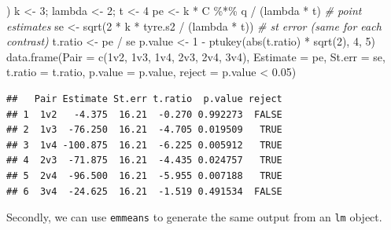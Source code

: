 \documentclass[
]{book}
\newenvironment{Shaded}{\begin{snugshade}}{\end{snugshade}}
\newcommand{\AttributeTok}[1]{\textcolor[rgb]{0.77,0.63,0.00}{#1}}
\newcommand{\CommentTok}[1]{\textcolor[rgb]{0.56,0.35,0.01}{\textit{#1}}}
\newcommand{\DecValTok}[1]{\textcolor[rgb]{0.00,0.00,0.81}{#1}}
\newcommand{\FloatTok}[1]{\textcolor[rgb]{0.00,0.00,0.81}{#1}}
\newcommand{\FunctionTok}[1]{\textcolor[rgb]{0.00,0.00,0.00}{#1}}
\newcommand{\NormalTok}[1]{#1}
\newcommand{\OtherTok}[1]{\textcolor[rgb]{0.56,0.35,0.01}{#1}}
\newcommand{\SpecialCharTok}[1]{\textcolor[rgb]{0.00,0.00,0.00}{#1}}
\newcommand{\StringTok}[1]{\textcolor[rgb]{0.31,0.60,0.02}{#1}}
\theoremstyle{definition}
\theoremstyle{definition}
\theoremstyle{definition}
\theoremstyle{definition}
\theoremstyle{remark}
\begin{document}
\begin{Shaded}
\begin{Highlighting}[]
\NormalTok{)}
\NormalTok{k }\OtherTok{\textless{}{-}} \DecValTok{3}\NormalTok{; lambda }\OtherTok{\textless{}{-}} \DecValTok{2}\NormalTok{; t }\OtherTok{\textless{}{-}} \DecValTok{4}
\NormalTok{pe }\OtherTok{\textless{}{-}}\NormalTok{ k }\SpecialCharTok{*}\NormalTok{ C }\SpecialCharTok{\%*\%}\NormalTok{ q }\SpecialCharTok{/}\NormalTok{ (lambda }\SpecialCharTok{*}\NormalTok{ t) }\CommentTok{\# point estimates}
\NormalTok{se }\OtherTok{\textless{}{-}} \FunctionTok{sqrt}\NormalTok{(}\DecValTok{2} \SpecialCharTok{*}\NormalTok{ k }\SpecialCharTok{*}\NormalTok{ tyre.s2 }\SpecialCharTok{/}\NormalTok{ (lambda }\SpecialCharTok{*}\NormalTok{ t)) }\CommentTok{\# st error (same for each contrast)}
\NormalTok{t.ratio }\OtherTok{\textless{}{-}}\NormalTok{ pe }\SpecialCharTok{/}\NormalTok{ se}
\NormalTok{p.value }\OtherTok{\textless{}{-}} \DecValTok{1} \SpecialCharTok{{-}} \FunctionTok{ptukey}\NormalTok{(}\FunctionTok{abs}\NormalTok{(t.ratio) }\SpecialCharTok{*} \FunctionTok{sqrt}\NormalTok{(}\DecValTok{2}\NormalTok{), }\DecValTok{4}\NormalTok{, }\DecValTok{5}\NormalTok{)}
\FunctionTok{data.frame}\NormalTok{(}\AttributeTok{Pair =} \FunctionTok{c}\NormalTok{(}\StringTok{\textquotesingle{}1v2\textquotesingle{}}\NormalTok{, }\StringTok{\textquotesingle{}1v3\textquotesingle{}}\NormalTok{, }\StringTok{\textquotesingle{}1v4\textquotesingle{}}\NormalTok{, }\StringTok{\textquotesingle{}2v3\textquotesingle{}}\NormalTok{, }\StringTok{\textquotesingle{}2v4\textquotesingle{}}\NormalTok{, }\StringTok{\textquotesingle{}3v4\textquotesingle{}}\NormalTok{),}
  \AttributeTok{Estimate =}\NormalTok{ pe, }\AttributeTok{St.err =}\NormalTok{ se, }\AttributeTok{t.ratio =}\NormalTok{ t.ratio, }
           \AttributeTok{p.value =}\NormalTok{ p.value, }\AttributeTok{reject =}\NormalTok{ p.value }\SpecialCharTok{\textless{}} \FloatTok{0.05}\NormalTok{)}
\end{Highlighting}
\end{Shaded}

\begin{verbatim}
##   Pair Estimate St.err t.ratio  p.value reject
## 1  1v2   -4.375  16.21  -0.270 0.992273  FALSE
## 2  1v3  -76.250  16.21  -4.705 0.019509   TRUE
## 3  1v4 -100.875  16.21  -6.225 0.005912   TRUE
## 4  2v3  -71.875  16.21  -4.435 0.024757   TRUE
## 5  2v4  -96.500  16.21  -5.955 0.007188   TRUE
## 6  3v4  -24.625  16.21  -1.519 0.491534  FALSE
\end{verbatim}

Secondly, we can use \texttt{emmeans} to generate the same output from an \texttt{lm} object.
\end{document}
